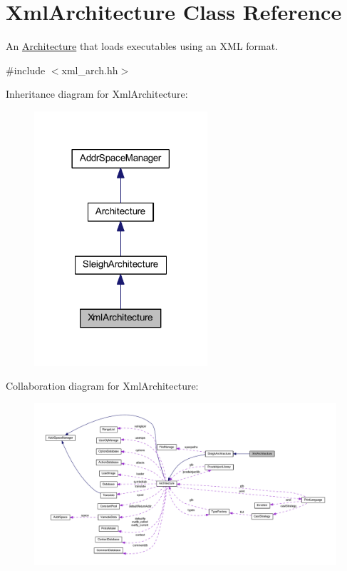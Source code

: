 \hypertarget{class_xml_architecture}{}\section{Xml\+Architecture Class Reference}
\label{class_xml_architecture}


An \mbox{\hyperlink{class_architecture}{Architecture}} that loads executables using an X\+ML format.  




{\ttfamily \#include $<$xml\+\_\+arch.\+hh$>$}



Inheritance diagram for Xml\+Architecture\+:
\nopagebreak
\begin{figure}[H]
\begin{center}
\leavevmode
\includegraphics[width=182pt]{class_xml_architecture__inherit__graph}
\end{center}
\end{figure}


Collaboration diagram for Xml\+Architecture\+:
\nopagebreak
\begin{figure}[H]
\begin{center}
\leavevmode
\includegraphics[width=350pt]{class_xml_architecture__coll__graph}
\end{center}
\end{figure}
